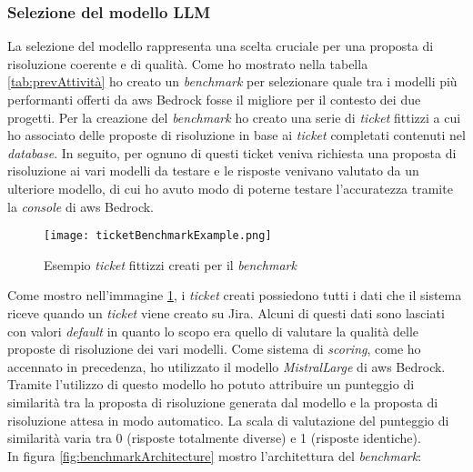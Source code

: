 \subsubsection{Selezione del modello LLM}
La selezione del modello rappresenta una scelta cruciale per una proposta di risoluzione coerente e di qualità. Come ho mostrato nella tabella \ref{tab:prevAttività} ho creato un \textit{benchmark} per selezionare quale tra i modelli più performanti offerti da \gls{aws} Bedrock fosse il migliore per il contesto dei due progetti.
Per la creazione del \textit{benchmark} ho creato una serie di \textit{ticket} fittizzi a cui ho associato delle proposte di risoluzione in base ai \textit{ticket} completati contenuti nel \textit{database}. In seguito, per ognuno di questi ticket veniva richiesta una proposta di risoluzione ai vari modelli da testare e le risposte venivano valutato da un ulteriore modello, di cui ho avuto modo di poterne testare l'accuratezza tramite la \textit{console} di \gls{aws} Bedrock.
\begin{figure}[H]
    \centering
    \texttt{[image: ticketBenchmarkExample.png]}
    \caption{Esempio \textit{ticket} fittizzi creati per il \textit{benchmark}}
    \label{fig:Ticketbenchmark}
\end{figure}
\noindent
Come mostro nell'immagine \ref{fig:Ticketbenchmark}, i \textit{ticket} creati possiedono tutti i dati che il sistema riceve quando un \textit{ticket} viene creato su Jira. Alcuni di questi dati sono lasciati con valori \textit{default} in quanto lo scopo era quello di valutare la qualità delle proposte di risoluzione dei vari modelli. 
Come sistema di \textit{scoring}, come ho accennato in precedenza, ho utilizzato il modello \textit{MistralLarge} di \gls{aws} Bedrock. Tramite l'utilizzo di questo modello ho potuto attribuire un punteggio di similarità tra la proposta di risoluzione generata dal modello e la proposta di risoluzione attesa in modo automatico. La scala di valutazione del punteggio di similarità varia tra 0 (risposte totalmente diverse) e 1 (risposte identiche). \\
In figura \ref{fig:benchmarkArchitecture} mostro l'architettura del \textit{benchmark}:
